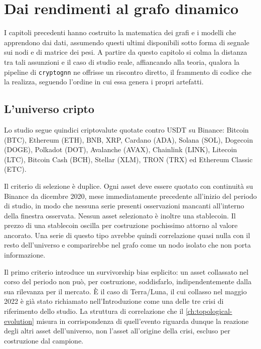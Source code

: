 \chapter{Dai rendimenti al grafo dinamico}
\label{ch:dynamic-correlation-graph}

I capitoli precedenti hanno costruito la matematica dei grafi e i modelli che apprendono dai dati, assumendo questi ultimi disponibili sotto forma di segnale sui nodi e di matrice dei pesi. A partire da questo capitolo si colma la distanza tra tali assunzioni e il caso di studio reale, affiancando alla teoria, qualora la pipeline di \texttt{cryptognn} ne offrisse un riscontro diretto, il frammento di codice che la realizza, seguendo l'ordine in cui essa genera i propri artefatti.

\section{L'universo cripto}
\label{sec:crypto-universe}

Lo studio segue quindici criptovalute quotate contro USDT su Binance: Bitcoin (BTC), Ethereum (ETH), BNB, XRP, Cardano (ADA), Solana (SOL), Dogecoin (DOGE), Polkadot (DOT), Avalanche (AVAX), Chainlink (LINK), Litecoin (LTC), Bitcoin Cash (BCH), Stellar (XLM), TRON (TRX) ed Ethereum Classic (ETC).

Il criterio di selezione è duplice. Ogni asset deve essere quotato con continuità su Binance da dicembre 2020, mese immediatamente precedente all'inizio del periodo di studio, in modo che nessuna serie presenti osservazioni mancanti all'interno della finestra osservata.
Nessun asset selezionato è inoltre una stablecoin. Il prezzo di una stablecoin oscilla per costruzione pochissimo attorno al valore ancorato. Una serie di questo tipo avrebbe quindi correlazione quasi nulla con il resto dell'universo e comparirebbe nel grafo come un nodo isolato che non porta informazione.

Il primo criterio introduce un survivorship bias esplicito: un asset collassato nel corso del periodo non può, per costruzione, soddisfarlo, indipendentemente dalla sua rilevanza per il mercato. È il caso di Terra/Luna, il cui collasso nel maggio 2022 è già stato richiamato nell'Introduzione come una delle tre crisi di riferimento dello studio. La struttura di correlazione che il \cref{ch:topological-evolution} misura in corrispondenza di quell'evento riguarda dunque la reazione degli altri asset dell'universo, non l'asset all'origine della crisi, escluso per costruzione dal campione.

